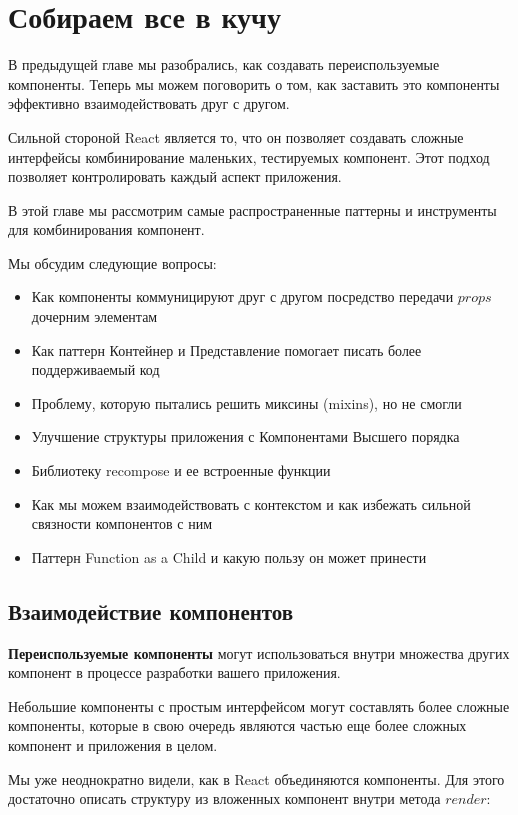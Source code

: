 \chapter{Собираем все в кучу}

В предыдущей главе мы разобрались, как создавать переиспользуемые компоненты. Теперь мы можем поговорить о том, как заставить это компоненты эффективно взаимодействовать друг с другом.

Сильной стороной React является то, что он позволяет создавать сложные интерфейсы комбинирование маленьких, тестируемых компонент. Этот подход позволяет контролировать каждый аспект приложения.

В этой главе мы рассмотрим самые распространенные паттерны и инструменты для комбинирования компонент.

Мы обсудим следующие вопросы:

\begin{itemize}
  \item Как компоненты коммуницируют друг с другом посредство передачи $props$ дочерним элементам
  \item Как паттерн Контейнер и Представление помогает писать более поддерживаемый код
  \item Проблему, которую пытались решить миксины (mixins), но не смогли
  \item Улучшение структуры приложения с Компонентами Высшего порядка
  \item Библиотеку recompose и ее встроенные функции
  \item Как мы можем взаимодействовать с контекстом и как избежать сильной связности компонентов с ним
  \item Паттерн Function as a Child и какую пользу он может принести
\end{itemize}


\section{Взаимодействие компонентов}

\textbf{Переиспользуемые компоненты} могут использоваться внутри множества других компонент в процессе разработки вашего приложения.

Небольшие компоненты с простым интерфейсом могут составлять более сложные компоненты, которые в свою очередь являются частью еще более сложных компонент и приложения в целом.

Мы уже неоднократно видели, как в React объединяются компоненты. Для этого достаточно описать структуру из вложенных компонент внутри метода $render$:

